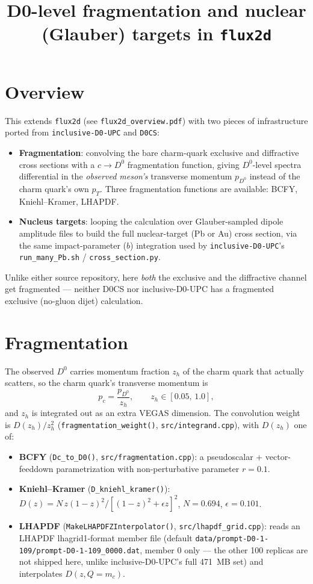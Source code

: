 \documentclass[11pt]{article}
\title{D0-level fragmentation and nuclear (Glauber) targets in \texttt{flux2d}}
\author{}
\date{}
\begin{document}
\maketitle

\section{Overview}

This extends \texttt{flux2d} (see \texttt{flux2d\_overview.pdf}) with two
pieces of infrastructure ported from \texttt{inclusive-D0-UPC} and
\texttt{D0CS}:

\begin{itemize}
\item \textbf{Fragmentation}: convolving the bare charm-quark exclusive and
diffractive cross sections with a $c\to D^0$ fragmentation function, giving
$D^0$-level spectra differential in the \emph{observed meson's} transverse
momentum $p_{D^0}$ instead of the charm quark's own $p_T$. Three
fragmentation functions are available: BCFY, Kniehl--Kramer, LHAPDF.
\item \textbf{Nucleus targets}: looping the calculation over
Glauber-sampled dipole amplitude files to build the full nuclear-target
(Pb or Au) cross section, via the same impact-parameter ($b$) integration
used by \texttt{inclusive-D0-UPC}'s \texttt{run\_many\_Pb.sh} /
\texttt{cross\_section.py}.
\end{itemize}

Unlike either source repository, here \emph{both} the exclusive and the
diffractive channel get fragmented — neither D0CS nor inclusive-D0-UPC
has a fragmented exclusive (no-gluon dijet) calculation.

\section{Fragmentation}

The observed $D^0$ carries momentum fraction $z_h$ of the charm quark that
actually scatters, so the charm quark's transverse momentum is
\[
p_c = \frac{p_{D^0}}{z_h}, \qquad z_h\in[0.05,\,1.0],
\]
and $z_h$ is integrated out as an extra VEGAS dimension. The convolution
weight is $D(z_h)/z_h^2$ (\texttt{fragmentation\_weight()},
\texttt{src/integrand.cpp}), with $D(z_h)$ one of:

\begin{itemize}
\item \textbf{BCFY} (\texttt{Dc\_to\_D0()}, \texttt{src/fragmentation.cpp}):
a pseudoscalar + vector-feeddown parametrization with non-perturbative
parameter $r=0.1$.
\item \textbf{Kniehl--Kramer} (\texttt{D\_kniehl\_kramer()}):
$D(z)=N\,z(1-z)^2/[(1-z)^2+\epsilon z]^2$, $N=0.694$, $\epsilon=0.101$.
\item \textbf{LHAPDF} (\texttt{MakeLHAPDFZInterpolator()},
\texttt{src/lhapdf\_grid.cpp}): reads an LHAPDF lhagrid1-format member file
(default \texttt{data/prompt-D0-1-109/prompt-D0-1-109\_0000.dat}, member 0
only — the other 100 replicas are not shipped here, unlike
inclusive-D0-UPC's full 471~MB set) and interpolates $D(z,Q{=}m_c)$.
\end{itemize}
\end{document}
